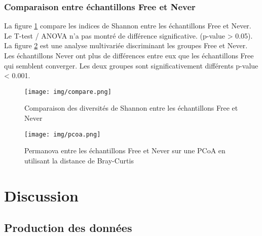 \documentclass[12pt,a4paper]{article}
\begin{document}
\subsubsection{Comparaison entre échantillons Free et Never}
La figure \ref{compare} compare les indices de Shannon entre les échantillons Free et Never. Le T-test / ANOVA n'a pas montré de différence significative. (p-value > 0.05). \\
La figure  \ref{pcoa} est une analyse multivariée discriminant les groupes Free et Never. Les échantillons Never ont plus de différences entre eux que les échantillons Free qui semblent converger.  Les deux groupes sont significativement différents p-value < 0.001.

\begin{figure}
\begin{center}
\texttt{[image: img/compare.png]}\hfill
\end{center}
\caption{Comparaison des diversités de Shannon entre les échantillons Free et Never}
\label{compare}
\end{figure}


\begin{figure}[t]
\begin{center}
\texttt{[image: img/pcoa.png]}\hfill
\end{center}
\caption{Permanova entre les échantillons Free et Never sur une PCoA en utilisant la distance de Bray-Curtis}
\label{pcoa}
\end{figure}

\newpage
\section{Discussion}
\subsection{Production des données}
\end{document}
